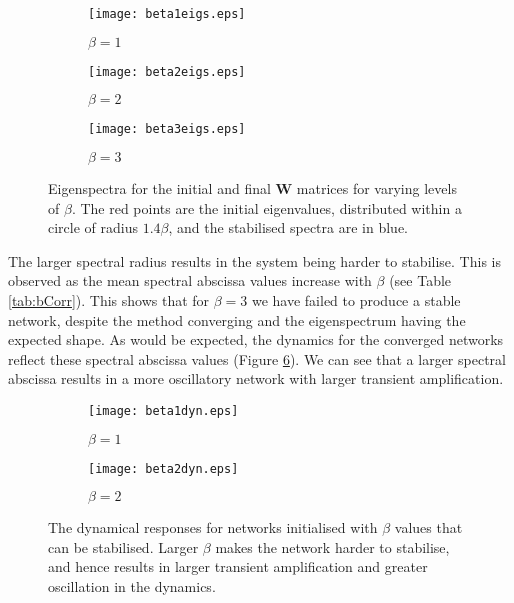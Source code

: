 \documentclass[12pt, a4paper]{article}
\begin{document}
\begin{figure}
    \begin{subfigure}{0.5\textwidth}
        \centering
        \texttt{[image: beta1eigs.eps]}
        \caption{$\beta = 1$}
        \label{fig:beta1eigs}
    \end{subfigure}
    \begin{subfigure}{0.5\textwidth}
        \centering
        \texttt{[image: beta2eigs.eps]}
        \caption{$\beta = 2$}
        \label{fig:beta2eigs}
    \end{subfigure}
    
    \centering
    \begin{subfigure}{0.5\textwidth}
        \centering
        \texttt{[image: beta3eigs.eps]}
        \caption{$\beta = 3$}
        \label{fig:beta3eigs}
    \end{subfigure}
    \caption{Eigenspectra for the initial and final $\mathbf{W}$ matrices for varying levels of $\beta$.  The red points are the initial eigenvalues, distributed within a circle of radius $1.4\beta$, and the stabilised spectra are in blue.}
    \label{fig:betaEigs}
\end{figure} 

The larger spectral radius results in the system being harder to stabilise.  This is observed as the mean spectral abscissa values increase with $\beta$ (see Table \ref{tab:bCorr}).  This shows that for $\beta = 3$ we have failed to produce a stable network, despite the method converging and the eigenspectrum having the expected shape.  As would be expected, the dynamics for the converged networks reflect these spectral abscissa values (Figure \ref{fig:betaDyn}). We can see that a larger spectral abscissa results in a more oscillatory network with larger transient amplification.	

\begin{figure}
    \begin{subfigure}{0.5\textwidth}
        \centering
        \texttt{[image: beta1dyn.eps]}
        \caption{$\beta = 1$}
        \label{fig:b1Dyn}
    \end{subfigure}
    \begin{subfigure}{0.5\textwidth}
        \centering
        \texttt{[image: beta2dyn.eps]}
        \caption{$\beta = 2$}
    \end{subfigure}
    \caption{The dynamical responses for networks initialised with $\beta$ values that can be stabilised.  Larger $\beta$ makes the network harder to stabilise, and hence results in larger transient amplification and greater oscillation in the dynamics.}
    \label{fig:betaDyn}
\end{figure}
\end{document}
